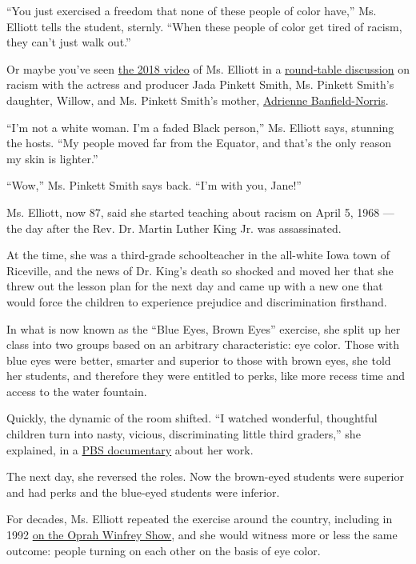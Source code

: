 ``You just exercised a freedom that none of these people of color
have,'' Ms. Elliott tells the student, sternly. ``When these people of
color get tired of racism, they can't just walk out.''

Or maybe you've seen
\href{https://twitter.com/PadmaLakshmi/status/1274380187086606337?s=20}{the
2018 video} of Ms. Elliott in a
\href{https://www.facebookcorewwwi.onion/538649879867825/posts/699300837136061/}{round-table
discussion} on racism with the actress and producer Jada Pinkett Smith,
Ms. Pinkett Smith's daughter, Willow, and Ms. Pinkett Smith's mother,
\href{https://www.nytimes3xbfgragh.onion/2020/03/27/style/self-care/adrienne-banfield-norris-red-table-talk.html}{Adrienne
Banfield-Norris}.

``I'm not a white woman. I'm a faded Black person,'' Ms. Elliott says,
stunning the hosts. ``My people moved far from the Equator, and that's
the only reason my skin is lighter.''

``Wow,'' Ms. Pinkett Smith says back. ``I'm with you, Jane!''

Ms. Elliott, now 87, said she started teaching about racism on April 5,
1968 --- the day after the Rev. Dr. Martin Luther King Jr. was
assassinated.

At the time, she was a third-grade schoolteacher in the all-white Iowa
town of Riceville, and the news of Dr. King's death so shocked and moved
her that she threw out the lesson plan for the next day and came up with
a new one that would force the children to experience prejudice and
discrimination firsthand.

In what is now known as the ``Blue Eyes, Brown Eyes'' exercise, she
split up her class into two groups based on an arbitrary characteristic:
eye color. Those with blue eyes were better, smarter and superior to
those with brown eyes, she told her students, and therefore they were
entitled to perks, like more recess time and access to the water
fountain.

Quickly, the dynamic of the room shifted. ``I watched wonderful,
thoughtful children turn into nasty, vicious, discriminating little
third graders,'' she explained, in a
\href{https://www.youtube.com/watch?v=1mcCLm_LwpE}{PBS documentary}
about her work.

The next day, she reversed the roles. Now the brown-eyed students were
superior and had perks and the blue-eyed students were inferior.

For decades, Ms. Elliott repeated the exercise around the country,
including in 1992 \href{https://www.youtube.com/watch?v=ebPoSMULI5U}{on
the Oprah Winfrey Show}, and she would witness more or less the same
outcome: people turning on each other on the basis of eye color.

